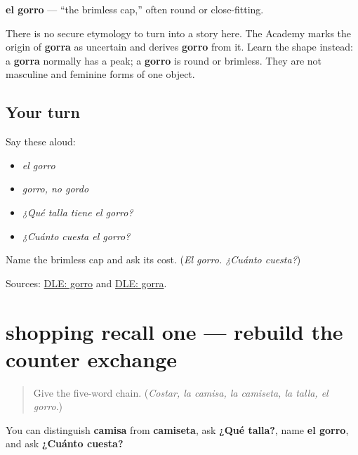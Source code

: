 \begin{cousinweb}
\textbf{el gorro} — \textquotedblleft{}the brimless cap,\textquotedblright{} often round or close-fitting.

There is no secure etymology to turn into a story here. The Academy marks the origin of \textbf{gorra} as uncertain and derives \textbf{gorro} from it. Learn the shape instead: a \textbf{gorra} normally has a peak; a \textbf{gorro} is round or brimless. They are not masculine and feminine forms of one object.
\end{cousinweb}

\subsection*{Your turn}
Say these aloud:

\begin{itemize}
\raggedright
  \item \emph{el gorro}
  \item \emph{gorro, no gordo}
  \item \emph{¿Qué talla tiene el gorro?}
  \item \emph{¿Cuánto cuesta el gorro?}
\end{itemize}

\begin{tcolorbox}[breakable,colback=teal!4,colframe=teal!35!black,title={Before you move on}]
Name the brimless cap and ask its cost. (\emph{El gorro. ¿Cuánto cuesta?})

Sources: \href{https://dle.rae.es/gorro}{DLE: gorro} and \href{https://dle.rae.es/gorra}{DLE: gorra}.
\end{tcolorbox}
\section[(review)]{shopping recall one — rebuild the counter exchange}

\label{lesson:ES-C402-shopping-recall-1}



\begin{quote}
Give the five-word chain. (\emph{Costar, la camisa, la camiseta, la talla, el gorro}.)
\end{quote}

\begin{grammarlens}[title={What you've built}]
You can distinguish \textbf{camisa} from \textbf{camiseta}, ask \textbf{¿Qué talla?}, name \textbf{el gorro}, and ask \textbf{¿Cuánto cuesta?}
\end{grammarlens}

